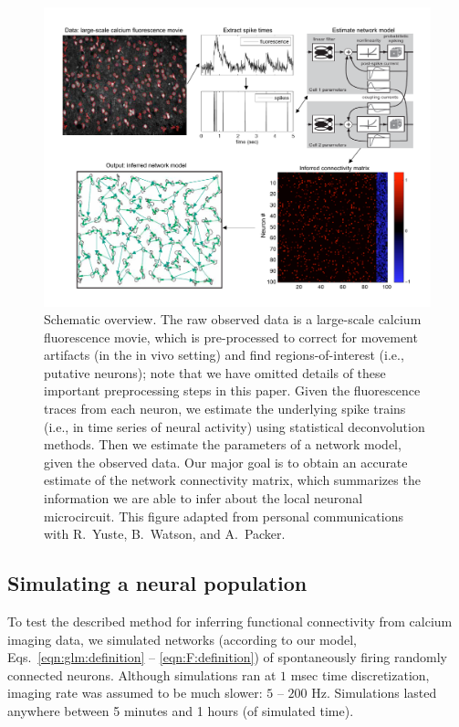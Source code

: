 \begin{figure}[t!] 
	\centering 
	\includegraphics[width=\hsize]{../figs/yuri-paper-schematic} 
	\caption{Schematic overview. The raw observed data is a large-scale calcium fluorescence movie, which is pre-processed to correct for movement artifacts (in the in vivo setting) and find regions-of-interest (i.e., putative neurons); note that we have omitted details of these important preprocessing steps in this paper. Given the fluorescence traces from each neuron, we estimate the underlying spike trains (i.e., in time series of neural activity) using statistical deconvolution methods. Then we estimate the parameters of a network model, given the observed data. Our major goal is to obtain an accurate estimate of the network connectivity matrix, which summarizes the information we are able to infer about the local neuronal microcircuit. This figure adapted from personal communications with R.\ Yuste, B.\ Watson, and A.\ Packer.} 
	\label{fig:data_schematic} 
\end{figure}

\subsection{Simulating a neural population} \label{sec:results:simulations}

To test the described method for inferring functional connectivity from calcium imaging data, we simulated networks (according to our model, Eqs.~\eqref{eqn:glm:definition} -- \eqref{eqn:F:definition}) of spontaneously firing randomly connected neurons. Although simulations ran at $1$ msec time discretization, imaging rate was assumed to be much slower: $5$ -- $200$ Hz. Simulations lasted anywhere between 5 minutes and 1 hours (of simulated time). 


